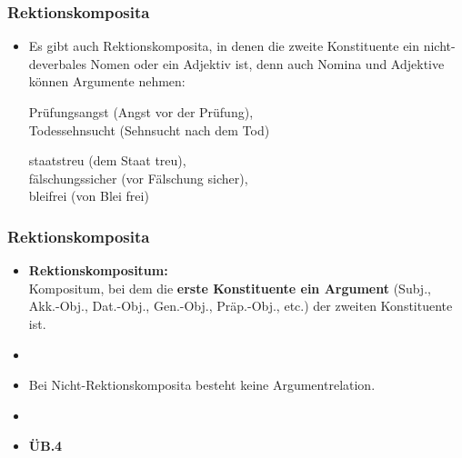\begin{frame}
\frametitle{Rektionskomposita}

\begin{itemize}
	\item Es gibt auch Rektionskomposita, in denen die zweite Konstituente ein nicht-deverbales Nomen oder ein Adjektiv ist, denn auch Nomina und Adjektive können Argumente nehmen:
	
	\ea Prüfungsangst (Angst vor der Prüfung), \\
		 Todessehnsucht (Sehnsucht nach dem Tod)
	\z
		 
	\ea staatstreu (dem Staat treu), \\
		 fälschungssicher (vor Fälschung sicher), \\
		 bleifrei (von Blei frei)
	\z
		 
\end{itemize}


\end{frame}


\begin{frame}
\frametitle{Rektionskomposita}

\begin{itemize}
	\item \textbf{Rektionskompositum:} \\
	Kompositum, bei dem die \textbf{erste Konstituente ein Argument} (Subj., Akk.-Obj., Dat.-Obj., Gen.-Obj., Präp.-Obj., etc.) der zweiten Konstituente ist.
	\item[]
	\item Bei Nicht-Rektionskomposita besteht keine Argumentrelation.
	\item[]
	\item[] \textbf{ÜB.4}
	
\end{itemize}


\end{frame}




